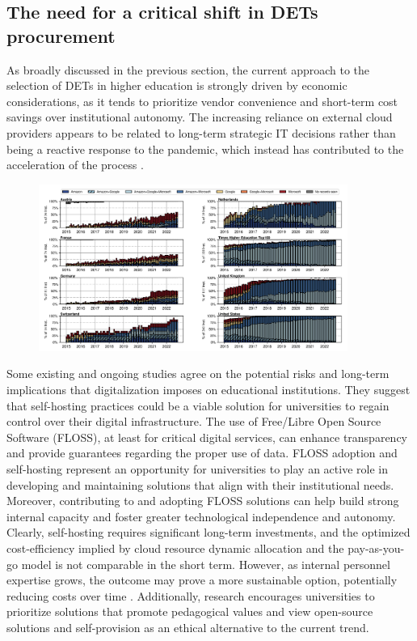 \subsection{The need for a critical shift in DETs procurement}
As broadly discussed in the previous section, the current approach to the selection of DETs in higher education is strongly driven by economic considerations, as it tends to prioritize vendor convenience and short-term cost savings over institutional autonomy. The increasing reliance on external cloud providers appears to be related to long-term strategic IT decisions rather than being a reactive response to the pandemic, which instead has contributed to the acceleration of the process \cite{fiebig_heads_2023}.

\begin{figure}[ht!]
  \centering
  \includegraphics[width=0.9\textwidth]{img/digitalization_erupean_hei_fiebig.png}
  \caption{}
  \label{fig:digitalization_european_universities}
\end{figure}

Some existing and ongoing studies agree on the potential risks and long-term implications that digitalization imposes on educational institutions. They suggest that self-hosting practices could be a viable solution for universities to regain control over their digital infrastructure. The use of Free/Libre Open Source Software (FLOSS), at least for critical digital services, can enhance transparency and provide guarantees regarding the proper use of data. FLOSS adoption and self-hosting represent an opportunity for universities to play an active role in developing and maintaining solutions that align with their institutional needs. Moreover, contributing to and adopting FLOSS solutions can help build strong internal capacity and foster greater technological independence and autonomy. Clearly, self-hosting requires significant long-term investments, and the optimized cost-efficiency implied by cloud resource dynamic allocation and the pay-as-you-go model is not comparable in the short term. However, as internal personnel expertise grows, the outcome may prove a more sustainable option, potentially reducing costs over time \cite{fiebig_heads_2023}. Additionally, research encourages universities to prioritize solutions that promote pedagogical values and view open-source solutions and self-provision as an ethical alternative to the current trend.

